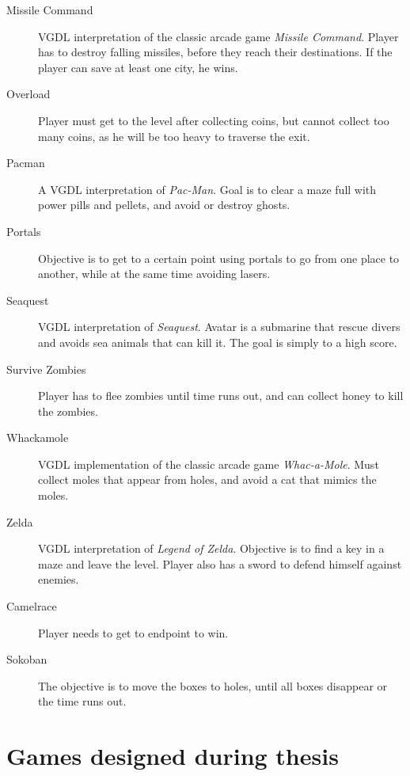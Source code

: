 \documentclass[a4paper,titlepage,final]{report}
\begin{document}
\begin{appendices}
\begin{description}
\item [Missile Command] VGDL interpretation of the classic arcade game \emph{Missile Command}. Player has to destroy falling missiles, before they reach their destinations. If the player can save at least one city, he wins.
\item [Overload] Player must get to the level after collecting coins, but cannot collect too many coins, as he will be too heavy to traverse the exit.
\item [Pacman] A VGDL interpretation of \emph{Pac-Man}. Goal is to clear a maze full with power pills and pellets, and avoid or destroy ghosts.
\item [Portals] Objective is to get to a certain point using portals to go from one place to another, while at the same time avoiding lasers.
\item [Seaquest] VGDL interpretation of \emph{Seaquest}. Avatar is a submarine that rescue divers and avoids sea animals that can kill it. The goal is simply to a high score.
\item [Survive Zombies] Player has to flee zombies until time runs out, and can collect honey to kill the zombies.
\item [Whackamole] VGDL implementation of the classic arcade game \emph{Whac-a-Mole}. Must collect moles that appear from holes, and avoid a cat that mimics the moles.
\item [Zelda] VGDL interpretation of \emph{Legend of Zelda}. Objective is to find a key in a maze and leave the level. Player also has a sword to defend himself against enemies.
\item [Camelrace] Player needs to get to endpoint to win.
\item [Sokoban] The objective is to move the boxes to holes, until all boxes disappear or the time runs out.
\end{description}


\chapter{Games designed during thesis}
\label{app_thesisgames}


\end{appendices}
\end{document}
